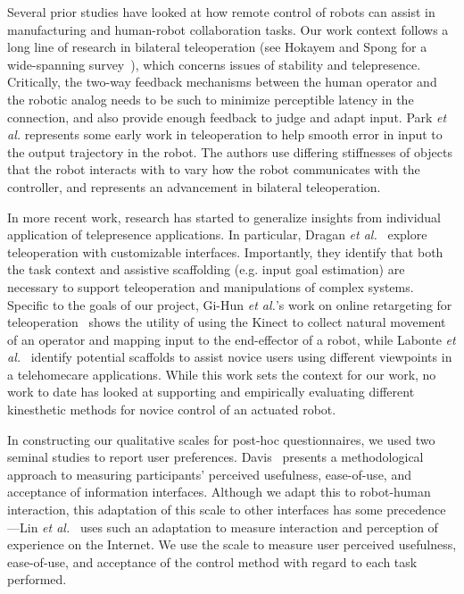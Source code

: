 \documentclass{sigchi}
\begin{document}
Several prior studies have looked at how remote control of robots can assist in manufacturing and human-robot collaboration tasks. Our work context follows a long line of research in bilateral teleoperation (see Hokayem and Spong for a wide-spanning survey~\cite{hokayem2006bilateral}), which concerns issues of stability and telepresence.  Critically, the two-way feedback mechanisms between the human operator and the robotic analog needs to be such to minimize perceptible latency in the connection, and also provide enough feedback to judge and adapt input.  Park \emph{et al.} represents some early work in teleoperation to help smooth error in input to the output trajectory in the robot.  The authors use differing stiffnesses of objects that the robot interacts with to vary how the robot communicates with the controller, and represents an advancement in bilateral teleoperation.

In more recent work, research has started to generalize insights from individual application of telepresence applications.  In particular, Dragan \emph{et al.}~\cite{dragan2013teleoperation} explore teleoperation with customizable interfaces.  Importantly, they identify that both the task context and assistive scaffolding (e.g. input goal estimation) are necessary to support teleoperation and manipulations of complex systems. Specific to the goals of our project, Gi-Hun \emph{et al.}'s work on online retargeting for teleoperation~\cite{yang2013online} shows the utility of using the Kinect to collect natural movement of an operator and mapping input to the end-effector of a robot, while Labonte \emph{et al.}~\cite{labonte2010comparative} identify potential scaffolds to assist novice users using different viewpoints in a telehomecare applications.  While this work sets the context for our work, no work to date has looked at supporting and empirically evaluating different kinesthetic methods for novice control of an actuated robot.

In constructing our qualitative scales for post-hoc questionnaires, we used two seminal studies to report user preferences.  Davis~\cite{Davis1989} presents a methodological approach to measuring participants' perceived usefulness, ease-of-use, and acceptance of information interfaces. Although we adapt this to robot-human interaction, this adaptation of this scale to other interfaces has some precedence---Lin \emph{et al.}~\cite{Lin2008} uses such an adaptation to measure interaction and perception of experience on the Internet.  We use the scale to measure user perceived usefulness, ease-of-use, and acceptance of the control method with regard to each task performed.
\end{document}
